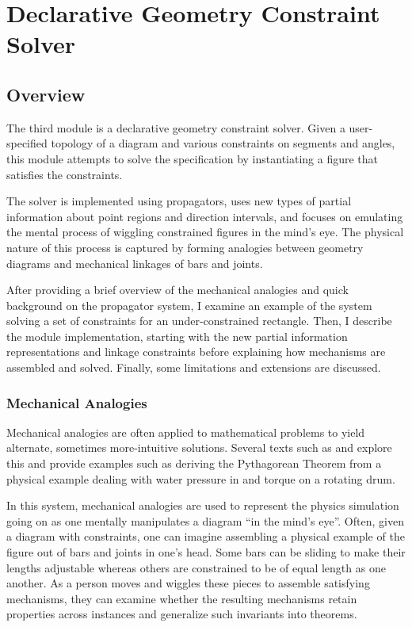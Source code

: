 \chapter{Declarative Geometry Constraint Solver}
\label{chap:declarative}

\section{Overview}

The third module is a declarative geometry constraint solver. Given a
user-specified topology of a diagram and various constraints on
segments and angles, this module attempts to solve the specification
by instantiating a figure that satisfies the constraints.

The solver is implemented using propagators, uses new types of partial
information about point regions and direction intervals, and focuses
on emulating the mental process of wiggling constrained figures in the
mind's eye. The physical nature of this process is captured by forming
analogies between geometry diagrams and mechanical linkages of bars
and joints.

After providing a brief overview of the mechanical analogies and quick
background on the propagator system, I examine an example of the
system solving a set of constraints for an under-constrained
rectangle. Then, I describe the module implementation, starting with
the new partial information representations and linkage constraints
before explaining how mechanisms are assembled and solved. Finally,
some limitations and extensions are discussed.


\subsection{Mechanical Analogies}

Mechanical analogies are often applied to mathematical problems to
yield alternate, sometimes more-intuitive solutions. Several texts
such as \cite{levi2009mathematical} and \cite{uspenskii1961some}
explore this and provide examples such as deriving the Pythagorean
Theorem from a physical example dealing with water pressure in and
torque on a rotating drum.

In this system, mechanical analogies are used to represent the physics
simulation going on as one mentally manipulates a diagram ``in the
mind's eye''. Often, given a diagram with constraints, one can imagine
assembling a physical example of the figure out of bars and joints in
one's head.  Some bars can be sliding to make their lengths adjustable
whereas others are constrained to be of equal length as one another.
As a person moves and wiggles these pieces to assemble satisfying
mechanisms, they can examine whether the resulting mechanisms retain
properties across instances and generalize such invariants into
theorems.

